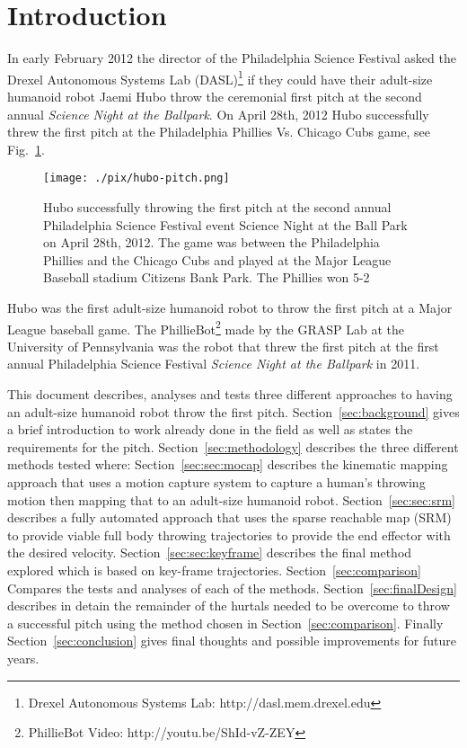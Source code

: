 \section{Introduction}
In early February 2012 the director of the Philadelphia Science Festival asked the Drexel Autonomous Systems Lab (DASL)\footnote{Drexel Autonomous Systems Lab: http://dasl.mem.drexel.edu}\label{foot:dasl} if they could have their adult-size humanoid robot Jaemi Hubo throw the ceremonial first pitch at the second annual \textit{Science Night at the Ballpark}.  On April 28th, 2012 Hubo successfully threw the first pitch at the Philadelphia Phillies Vs. Chicago Cubs game, see Fig.~\ref{fig:hubo-throw}.  

\begin{figure}[t]
  \centering
\texttt{[image: ./pix/hubo-pitch.png]}
  \caption{Hubo successfully throwing the first pitch at the second annual Philadelphia Science Festival event Science Night at the Ball Park on April 28th, 2012.  The game was between the Philadelphia Phillies and the Chicago Cubs and played at the Major League Baseball stadium Citizens Bank Park.  The Phillies won 5-2}
  \label{fig:hubo-throw}
\end{figure}

Hubo was the first adult-size humanoid robot to throw the first pitch at a Major League baseball game.  The PhillieBot\footnote{PhillieBot Video: http://youtu.be/ShId-vZ-ZEY} made by the GRASP Lab at the University of Pennsylvania was the robot that threw the first pitch at the first annual Philadelphia Science Festival \textit{Science Night at the Ballpark} in 2011.  

This document describes, analyses and tests three different approaches to having an adult-size humanoid robot throw the first pitch.  
Section~\ref{sec:background} gives a brief introduction to work already done in the field as well as states the requirements for the pitch.
Section~\ref{sec:methodology} describes the three different methods tested where:
Section~\ref{sec:sec:mocap} describes the kinematic mapping approach that uses a motion capture system to capture a human's throwing motion then mapping that to an adult-size humanoid robot.  
Section~\ref{sec:sec:srm} describes a fully automated approach that uses the sparse reachable map (SRM) to provide viable full body throwing trajectories to provide the end effector with the desired velocity\cite{dlofaro-srm}.
Section~\ref{sec:sec:keyframe} describes the final method explored which is based on key-frame trajectories.
Section~\ref{sec:comparison} Compares the tests and analyses of each of the methods.
Section~\ref{sec:finalDesign} describes in detain the remainder of the hurtals needed to be overcome to throw a successful pitch using the method chosen in Section~\ref{sec:comparison}.
Finally Section~\ref{sec:conclusion} gives final thoughts and possible improvements for future years.


